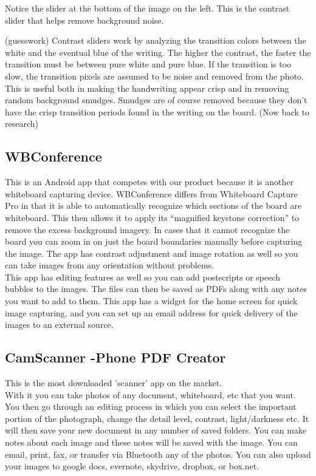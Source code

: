 \documentclass[]{article}
\begin{document}
			Notice the slider at the bottom of the image on the left. This is the contrast slider that helps remove background noise.

			(guesswork)
			Contrast sliders work by analyzing the transition colors between the white and the eventual blue of the writing. The higher the contrast, the faster the transition must be between pure white and pure blue. If the transition is too slow, the transition pixels are assumed to be noise and removed from the photo. This is useful both in making the handwriting appear crisp and in removing random background smudges. Smudges are of course removed because they don’t have the crisp transition periods found in the writing on the board.
			(Now back to research)
			
		\subsection{WBConference}
			This is an Android app that competes with our product because it is another whiteboard capturing device. WBConference differs from Whiteboard Capture Pro in that it is able to automatically recognize which sections of the board are whiteboard. This then allows it to apply its “magnified keystone correction” to remove the excess background imagery. In cases that it cannot recognize the board you can zoom in on just the board boundaries manually before capturing the image. The app has contrast adjustment and image rotation as well so you can take images from any orientation without problems.\\
			
			This app has editing features as well so you can add postscripts or speech bubbles to the images. The files can then be saved as PDFs along with any notes you want to add to them. This app has a widget for the home screen for quick image capturing, and you can set up an email address for quick delivery of the images to an external source.\\

		\subsection{CamScanner -Phone PDF Creator}
			This is the most downloaded 'scanner' app on the market.\\
			
			With it you can take photos of any document, whiteboard, etc that you want. You then go through an editing process in which you can select the important portion of the photograph, change the detail level, contrast, light/darkness etc. It will then save your new document in any number of saved folders. You can make notes about each image and these notes will be saved with the image. You can email, print, fax, or transfer via Bluetooth any of the photos. You can also upload your images to google docs, evernote, skydrive, dropbox, or box.net. \\
			
\end{document}
